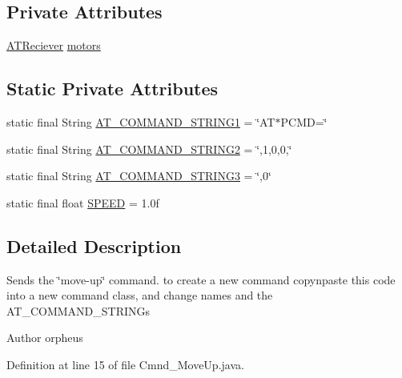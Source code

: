 \subsection*{Private Attributes}
\begin{DoxyCompactItemize}
\item 
\hyperlink{class_drone_1_1_hardware_1_1_a_t_reciever}{A\+T\+Reciever} \hyperlink{class_drone_1_1_drone_commands_1_1_cmnd___move_up_aaef759c5762f10ff3de1072e24ce1b71}{motors}
\end{DoxyCompactItemize}
\subsection*{Static Private Attributes}
\begin{DoxyCompactItemize}
\item 
static final String \hyperlink{class_drone_1_1_drone_commands_1_1_cmnd___move_up_a72aac8e499e474b70b46db3f90b094dc}{A\+T\+\_\+\+C\+O\+M\+M\+A\+N\+D\+\_\+\+S\+T\+R\+I\+N\+G1} = \char`\"{}A\+T$\ast$P\+C\+M\+D=\char`\"{}
\item 
static final String \hyperlink{class_drone_1_1_drone_commands_1_1_cmnd___move_up_a662258129137e91eb02e4620e9044ece}{A\+T\+\_\+\+C\+O\+M\+M\+A\+N\+D\+\_\+\+S\+T\+R\+I\+N\+G2} = \char`\"{},1,0,0,\char`\"{}
\item 
static final String \hyperlink{class_drone_1_1_drone_commands_1_1_cmnd___move_up_ae04f16b0fcbe1ba267bccca616e6bef1}{A\+T\+\_\+\+C\+O\+M\+M\+A\+N\+D\+\_\+\+S\+T\+R\+I\+N\+G3} = \char`\"{},0\char`\"{}
\item 
static final float \hyperlink{class_drone_1_1_drone_commands_1_1_cmnd___move_up_ad13629ea9d3d529c885bb532f8eb999f}{S\+P\+E\+E\+D} = 1.\+0f
\end{DoxyCompactItemize}


\subsection{Detailed Description}
Sends the \char`\"{}move-\/up\char`\"{} command. to create a new command copy\textquotesingle{}n\textquotesingle{}paste this code into a new command class, and change names and the A\+T\+\_\+\+C\+O\+M\+M\+A\+N\+D\+\_\+\+S\+T\+R\+I\+N\+G\textquotesingle{}s \begin{DoxyAuthor}{Author}
orpheus 
\end{DoxyAuthor}


Definition at line 15 of file Cmnd\+\_\+\+Move\+Up.\+java.



